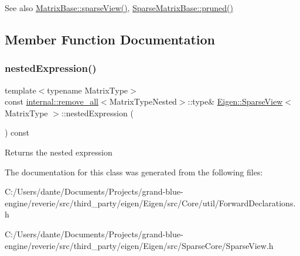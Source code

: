 \begin{DoxySeeAlso}{See also}
\mbox{\hyperlink{class_eigen_1_1_matrix_base_a320dd291cbf4339c6118c41521b75350}{Matrix\+Base\+::sparse\+View()}}, \mbox{\hyperlink{class_eigen_1_1_sparse_matrix_base_ac8d0414b56d9d620ce9a698c1b281e5d}{Sparse\+Matrix\+Base\+::pruned()}} 
\end{DoxySeeAlso}


\subsection{Member Function Documentation}
\mbox{\label{class_eigen_1_1_sparse_view_a50f53a9405017012077ae907959aca14}} 
\subsubsection{\texorpdfstring{nestedExpression()}{nestedExpression()}}
{\footnotesize\ttfamily template$<$typename Matrix\+Type$>$ \\
const \mbox{\hyperlink{struct_eigen_1_1internal_1_1remove__all}{internal\+::remove\+\_\+all}}$<$Matrix\+Type\+Nested$>$\+::type\& \mbox{\hyperlink{class_eigen_1_1_sparse_view}{Eigen\+::\+Sparse\+View}}$<$ Matrix\+Type $>$\+::nested\+Expression (\begin{DoxyParamCaption}{ }\end{DoxyParamCaption}) const\hspace{0.3cm}{\ttfamily [inline]}}

\begin{DoxyReturn}{Returns}
the nested expression 
\end{DoxyReturn}


The documentation for this class was generated from the following files\+:\begin{DoxyCompactItemize}
\item 
C\+:/\+Users/dante/\+Documents/\+Projects/grand-\/blue-\/engine/reverie/src/third\+\_\+party/eigen/\+Eigen/src/\+Core/util/Forward\+Declarations.\+h\item 
C\+:/\+Users/dante/\+Documents/\+Projects/grand-\/blue-\/engine/reverie/src/third\+\_\+party/eigen/\+Eigen/src/\+Sparse\+Core/Sparse\+View.\+h\end{DoxyCompactItemize}
